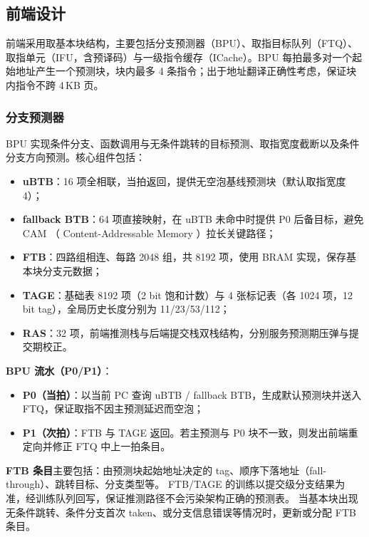 \subsection{前端设计}

前端采用取基本块结构，主要包括分支预测器（BPU）、取指目标队列（FTQ）、取指单元（IFU，含预译码）与一级指令缓存（ICache）。BPU 每拍最多对一个起始地址产生一个预测块，块内最多 4 条指令；出于地址翻译正确性考虑，保证块内指令不跨 4\,KB 页。

\subsubsection{分支预测器}

BPU 实现条件分支、函数调用与无条件跳转的目标预测、取指宽度截断以及条件分支方向预测。核心组件包括：

\begin{itemize}
  \item \textbf{uBTB}：16 项全相联，当拍返回，提供无空泡基线预测块（默认取指宽度 4）；
  \item \textbf{fallback BTB}：64 项直接映射，在 uBTB 未命中时提供 P0 后备目标，避免 CAM （ Content-Addressable Memory ）拉长关键路径；
  \item \textbf{FTB}：四路组相连、每路 2048 组，共 8192 项，使用 BRAM 实现，保存基本块分支元数据；
  \item \textbf{TAGE}：基础表 8192 项（2 bit 饱和计数）与 4 张标记表（各 1024 项，12 bit tag），全局历史长度分别为 11/23/53/112；
  \item \textbf{RAS}：32 项，前端推测栈与后端提交栈双栈结构，分别服务预测期压弹与提交期校正。
\end{itemize}

\textbf{BPU 流水（P0/P1）}：

\begin{itemize}
  \item \textbf{P0（当拍）}：以当前 PC 查询 uBTB / fallback BTB，生成默认预测块并送入 FTQ，保证取指不因主预测延迟而空泡；
  \item \textbf{P1（次拍）}：FTB 与 TAGE 返回。若主预测与 P0 块不一致，则发出前端重定向并修正 FTQ 中上一拍条目。
\end{itemize}

\textbf{FTB 条目}主要包括：由预测块起始地址决定的 tag、顺序下落地址（fall-through）、跳转目标、分支类型等。
FTB/TAGE 的训练以提交级分支结果为准，经训练队列回写，保证推测路径不会污染架构正确的预测表。
当基本块出现无条件跳转、条件分支首次 taken、或分支信息错误等情况时，更新或分配 FTB 条目。

